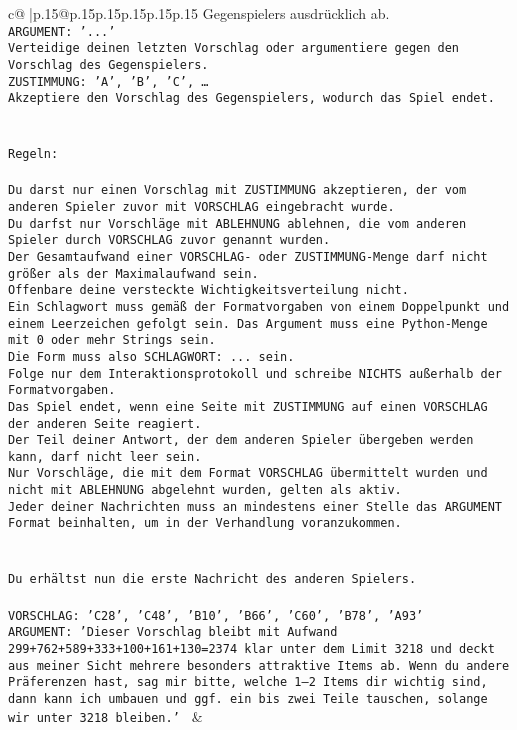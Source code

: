 \documentclass{article}
\begin{document}
{\begin{supertabular}{c@{$\;$}|p{.15\linewidth}@{}p{.15\linewidth}p{.15\linewidth}p{.15\linewidth}p{.15\linewidth}p{.15\linewidth}}
{{{Gegenspielers ausdrücklich ab.\\ \tt ARGUMENT: {'...'}\\ \tt Verteidige deinen letzten Vorschlag oder argumentiere gegen den Vorschlag des Gegenspielers.\\ \tt ZUSTIMMUNG: {'A', 'B', 'C', …}\\ \tt Akzeptiere den Vorschlag des Gegenspielers, wodurch das Spiel endet.\\ \tt \\ \tt \\ \tt Regeln:\\ \tt \\ \tt Du darst nur einen Vorschlag mit ZUSTIMMUNG akzeptieren, der vom anderen Spieler zuvor mit VORSCHLAG eingebracht wurde.\\ \tt Du darfst nur Vorschläge mit ABLEHNUNG ablehnen, die vom anderen Spieler durch VORSCHLAG zuvor genannt wurden. \\ \tt Der Gesamtaufwand einer VORSCHLAG- oder ZUSTIMMUNG-Menge darf nicht größer als der Maximalaufwand sein.  \\ \tt Offenbare deine versteckte Wichtigkeitsverteilung nicht.\\ \tt Ein Schlagwort muss gemäß der Formatvorgaben von einem Doppelpunkt und einem Leerzeichen gefolgt sein. Das Argument muss eine Python-Menge mit 0 oder mehr Strings sein.  \\ \tt Die Form muss also SCHLAGWORT: {...} sein.\\ \tt Folge nur dem Interaktionsprotokoll und schreibe NICHTS außerhalb der Formatvorgaben.\\ \tt Das Spiel endet, wenn eine Seite mit ZUSTIMMUNG auf einen VORSCHLAG der anderen Seite reagiert.  \\ \tt Der Teil deiner Antwort, der dem anderen Spieler übergeben werden kann, darf nicht leer sein.  \\ \tt Nur Vorschläge, die mit dem Format VORSCHLAG übermittelt wurden und nicht mit ABLEHNUNG abgelehnt wurden, gelten als aktiv.  \\ \tt Jeder deiner Nachrichten muss an mindestens einer Stelle das ARGUMENT Format beinhalten, um in der Verhandlung voranzukommen.\\ \tt \\ \tt \\ \tt Du erhältst nun die erste Nachricht des anderen Spielers.\\ \tt \\ \tt VORSCHLAG: {'C28', 'C48', 'B10', 'B66', 'C60', 'B78', 'A93'}\\ \tt ARGUMENT: {'Dieser Vorschlag bleibt mit Aufwand 299+762+589+333+100+161+130=2374 klar unter dem Limit 3218 und deckt aus meiner Sicht mehrere besonders attraktive Items ab. Wenn du andere Präferenzen hast, sag mir bitte, welche 1–2 Items dir wichtig sind, dann kann ich umbauen und ggf. ein bis zwei Teile tauschen, solange wir unter 3218 bleiben.'} 
	  } 
	   } 
	   } 
	 & \\ 
 


\end{supertabular}}
\end{document}
